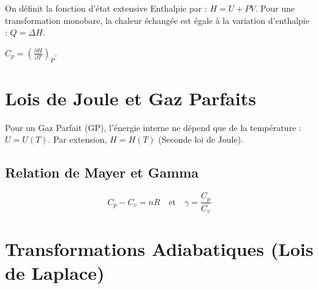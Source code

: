 \documentclass[french]{yLectureNote}
\begin{document}
\begin{theorem}[Enthalpie]
    On définit la fonction d'état extensive Enthalpie par : $H = U + PV$.
    Pour une transformation monobare, la chaleur échangée est égale à la variation d'enthalpie : $Q = \Delta H$.
\end{theorem}

\begin{theorem}
    $C_p = \left(\frac{\partial H}{\partial T}\right)_P$.
\end{theorem}

\section{Lois de Joule et Gaz Parfaits}

\begin{theorem}
    Pour un Gaz Parfait (GP), l'énergie interne ne dépend que de la température : $U = U(T)$.
    Par extension, $H = H(T)$ (Seconde loi de Joule).
\end{theorem}

\subsection{Relation de Mayer et Gamma}
\begin{theorem}
    $$C_p - C_v = nR \quad \text{et} \quad \gamma = \frac{C_p}{C_v}$$
\end{theorem}


\section{Transformations Adiabatiques (Lois de Laplace)}

\end{document}
